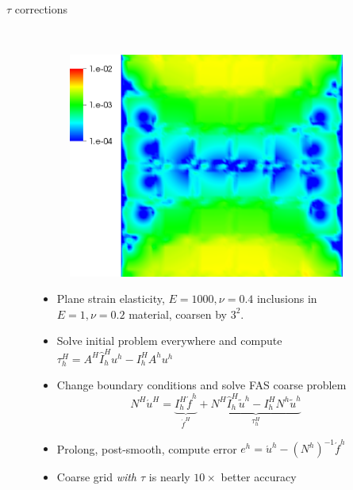 \documentclass{beamer}
\begin{document}
\begin{frame}{$\tau$ corrections}
\begin{figure}
\begin{subfigure}[b]{0.28\textwidth}
  \end{subfigure} ~
  \begin{subfigure}[b]{0.28\textwidth}
    \includegraphics[width=\textwidth]{figures/MG/ElasticityCompressErrorTauTrim}
  \end{subfigure}
  \begin{itemize}
  \item Plane strain elasticity, $E=1000,\nu=0.4$ inclusions in $E=1,\nu=0.2$ material, coarsen by $3^2$.
  \item Solve initial problem everywhere and compute $\tau_h^H = A^H \hat I_h^H u^h - I_h^H A^h u^h$
  \item Change boundary conditions and solve FAS coarse problem
    \begin{equation*}
      N^H \acute u^H = \underbrace{I_h^H \acute f^h}_{\acute f^H} + \underbrace{N^H \hat I_h^H \tilde u^h - I_h^H N^h \tilde u^h}_{\tau_h^H}
    \end{equation*}
  \item Prolong, post-smooth, compute error $e^h = \acute u^h - (N^h)^{-1} \acute f^h$
  \item<2> \alert{Coarse grid \emph{with $\tau$} is nearly $10\times$ better accuracy}
  \end{itemize}

\end{figure}
\end{frame}
\end{document}

